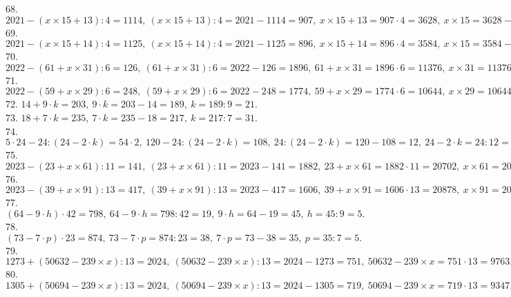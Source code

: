 68. $2021-(x\times15+13):4=1114,\ (x\times15+13):4=2021-1114=907,\ x\times15+13=907\cdot4=3628,\ x\times15=3628-13=3615,\ x=3615:15=241.$\\
69. $2021-(x\times15+14):4=1125,\ (x\times15+14):4=2021-1125=896,\ x\times15+14=896\cdot4=3584,\ x\times15=3584-14=3570,\ x=3570:15=238.$\\
70. $2022-(61+x\times31):6=126,\ (61+x\times31):6=2022-126=1896,\ 61+x\times31=1896\cdot6=11376,\ x\times31=11376-61=11315,\ x=11315:31=365.$\\
71. $2022-(59+x\times29):6=248,\ (59+x\times29):6=2022-248=1774,\ 59+x\times29=1774\cdot6=10644,\ x\times29=10644-59=10585,\ x=10585:29=365.$\\
72. $14+9\cdot k=203,\ 9\cdot k=203-14=189,\ k=189:9=21.$\\
73. $18+7\cdot k=235,\ 7\cdot k=235-18=217,\ k=217:7=31.$\\
74. $5\cdot24-24:(24-2\cdot k)=54\cdot2,\ 120-24:(24-2\cdot k)=108,\ 24:(24-2\cdot k)=120-108=12,\ 24-2\cdot k=24:12=2,\ 2\cdot k=24-2=22,\ k=22:2=11.$\\
75. $2023 - (23 + x \times 61) : 11 = 141,\ (23 + x \times 61) : 11 =2023-141=1882,\ 23 + x \times 61=1882\cdot11=20702,\ x \times 61=20702-23=20679,\ x=20679:61=339.$\\
76. $2023 - (39 + x \times 91) : 13 = 417,\ (39 + x \times 91) : 13 = 2023-417=1606,\ 39 + x \times 91=1606\cdot13=20878,\ x \times 91=20878-39=20839,\ x=20839:91=229.$\\
77. $(64 - 9 \cdot h) \cdot 42 = 798,\ 64 - 9 \cdot h=798:42=19,\ 9 \cdot h=64-19=45,\ h=45:9=5.$\\
78. $(73 - 7 \cdot p) \cdot 23 = 874,\ 73 - 7 \cdot p=874:23=38,\ 7 \cdot p=73-38=35,\ p=35:7=5.$\\
79. $1273+(50632-239\times x):13=2024,\ (50632-239\times x):13=2024-1273=751,\ 50632-239\times x=751\cdot13=9763,\ 239\times x=50632-9763=40869,\ x=40869:239=171.$\\
80. $1305+(50694-239\times x):13=2024,\ (50694-239\times x):13=2024-1305=719,\ 50694-239\times x=719\cdot13=9347,\ 239\times x=50694-9347=41347,\ x=41347:239=173.$
\newpage
